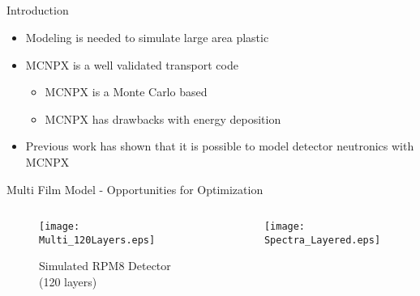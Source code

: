\subsection*{}
\begin{frame}{Introduction}
  \large
  \vspace{1cm}
  \normalsize
  \begin{itemize}
    \item Modeling is needed to simulate large area plastic
    \item MCNPX is a well validated transport code
    \begin{itemize}
        \item MCNPX is a Monte Carlo based
        \item MCNPX has drawbacks with energy deposition
    \end{itemize}
    \item Previous work has shown that it is possible to model detector neutronics with MCNPX
  \end{itemize}
\end{frame}
\begin{frame}{Multi Film Model - Opportunities for Optimization}
  \begin{columns}[onlytextwidth]
    \begin{column}{0.49\textwidth}
	    \begin{figure}
        \centering
        \texttt{[image: Multi\_120Layers.eps]}
        \caption{Simulated RPM8 Detector (120 layers)}
      \end{figure}
    \end{column}
    \begin{column}{0.49\textwidth}
      \begin{figure}
        \centering
        \texttt{[image: Spectra\_Layered.eps]}
      \end{figure}
    \end{column}
  \end{columns}
\end{frame}
